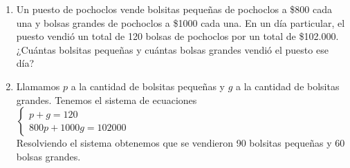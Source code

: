 \documentclass[a4paper]{article}
\newcommand{\answer}{\item[**]}
\begin{document}
\begin{enumerate}
\begin{enumerate} [label=(\alph*)]
		\item Un puesto de pochoclos vende bolsitas pequeñas de pochoclos a \$800 cada una y bolsas grandes de pochoclos a \$1000 cada una. En un día particular, el puesto vendió un total de 120 bolsas de pochoclos por un total de \$102.000. ¿Cuántas bolsitas pequeñas y cuántas bolsas grandes vendió el puesto ese día?
		\answer Llamamos $p$ a la cantidad de bolsitas pequeñas y $g$ a la cantidad de bolsitas grandes. Tenemos el sistema de ecuaciones \\ \vspace{2mm} $\left\{\begin{matrix} p+g=120 \\ 800p+1000g=102000 \end{matrix}\right.$ \\ Resolviendo el sistema obtenemos que se vendieron 90 bolsitas pequeñas y 60 bolsas grandes.


\end{enumerate}
\end{enumerate}
\end{document}
